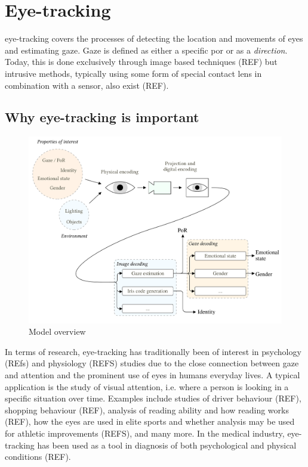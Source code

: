 \section{Eye-tracking}\label{sec:eye-tracking}
\Gls{eye-tracking} covers the processes of detecting the location and movements of eyes and estimating \gls{gaze}. Gaze is defined as either a specific \acrfull{por} or as a \emph{direction}. Today, this is done exclusively through image based techniques (REF) but intrusive methods, typically using some form of special contact lens in combination with a sensor, also exist (REF).

\subsection{Why eye-tracking is important}
\begin{figure}
	\centering
	\includegraphics[width=1\textwidth]{figures/model/eye-tracking-model}
	\caption{Model overview}\label{fig:eye-tracking-model}
\end{figure}





In terms of research, \gls{eye-tracking} has traditionally been of interest in psychology (REfs) and physiology (REFS) studies due to the close connection between gaze and attention and the prominent use of eyes in humans everyday lives. A typical application is the study of visual attention, i.e. where a person is looking in a specific situation over time. Examples include studies of driver behaviour (REF), shopping behaviour (REF), analysis of reading ability and how reading works (REF), how the eyes are used in elite sports and whether analysis may be used for athletic improvements (REFS), and many more. In the medical industry, eye-tracking has been used as a tool in diagnosis of both psychological and physical conditions (REF). 

